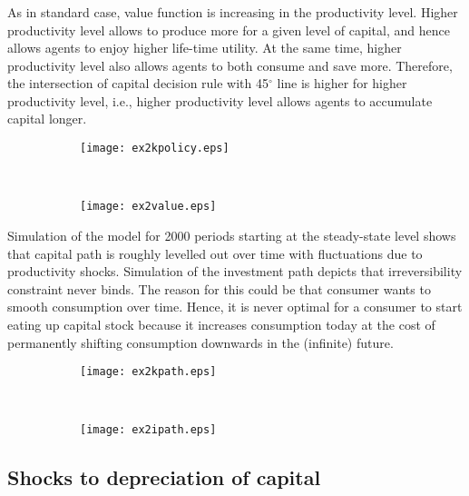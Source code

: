 \documentclass[]{article}
\begin{document}
\subsubsection{}

As in standard case, value function is increasing in the productivity level. Higher productivity level allows to produce more for a given level of capital, and hence allows agents to enjoy higher life-time utility. At the same time, higher productivity level also allows agents to both consume and save more. Therefore, the intersection of capital decision rule with 45$^\circ$ line is higher for higher productivity level, i.e., higher productivity level allows agents to accumulate capital longer.

\begin{figure}[h]
	\centering
	\begin{subfigure}{0.45\textwidth}
		\centering
		\texttt{[image: ex2kpolicy.eps]}
	\end{subfigure} ~
	\begin{subfigure}{0.45\textwidth}
		\centering
		\texttt{[image: ex2value.eps]}
	\end{subfigure}
\end{figure}

Simulation of the model for 2000 periods starting at the steady-state level shows that capital path is roughly levelled out over time with fluctuations due to productivity shocks. Simulation of the investment path depicts that irreversibility constraint never binds. The reason for this could be that consumer wants to smooth consumption over time. Hence, it is never optimal for a consumer to start eating up capital stock because it increases consumption today at the cost of permanently shifting consumption downwards in the (infinite) future. 

\begin{figure}[h]
	\centering
	\begin{subfigure}{0.45\textwidth}
		\centering
		\texttt{[image: ex2kpath.eps]}
	\end{subfigure} ~
	\begin{subfigure}{0.45\textwidth}
		\centering
		\texttt{[image: ex2ipath.eps]}
	\end{subfigure}
\end{figure}

\subsection{Shocks to depreciation of capital}
\end{document}
